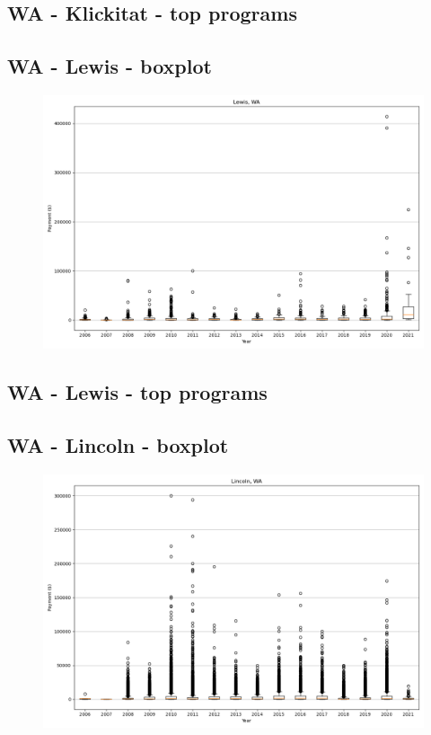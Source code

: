 \subsection*{WA - Klickitat - top programs}

\newpage
\subsection*{WA - Lewis - boxplot}
\begin{figure}[h]
\centering
\includegraphics[width=7in]{../output/boxplots/counties/Lewis-WA_boxplot.png}
\end{figure}


\subsection*{WA - Lewis - top programs}

\newpage
\subsection*{WA - Lincoln - boxplot}
\begin{figure}[h]
\centering
\includegraphics[width=7in]{../output/boxplots/counties/Lincoln-WA_boxplot.png}
\end{figure}


